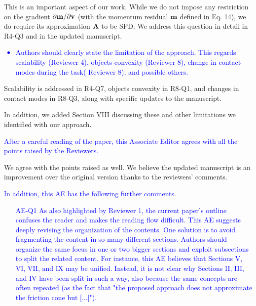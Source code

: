 This is an important aspect of our work. While we do not impose any restriction
on the gradient $\partial {\mathbf{m}}/\partial {\mathbf{v}}$ (with the momentum residual
${\mathbf{m}}$ defined in Eq. 14), we do require its approximation ${\mathbf{A}}$ to be SPD.
We address this question in detail in R4-Q3 and in the updated manuscript.


\textcolor{blue}{
\begin{itemize}
    \item Authors should clearly state the limitation of the approach. This
regards scalability (Reviewer 4), objects convexity (Reviewer 8), change in
contact modes during the task( Reviewer 8), and possible others. \end{itemize}}

Scalability is addressed in R4-Q7, objects convexity in R8-Q1, and changes in
contact modes in R8-Q3, along with specific updates to the manuscript.

In addition, we added Section VIII discussing these and other limitations we
identified with our approach.

\vspace{5mm}
\textcolor{blue}{After a careful reading of the paper, this Associate Editor
agrees with all the points raised by the Reviewers.}

We agree with the points raised as well. We believe the updated manuscript is an
improvement over the original version thanks to the reviewers' comments.

\vspace{5mm}
\textcolor{blue}{In addition, this AE has the following further comments.}
\textcolor{blue}{
\begin{itemize}
    \item[AE-Q1] As also highlighted by Reviewer 1, the current paper's outline
confuses the reader and makes the reading flow difficult. This AE suggests
deeply revising the organization of the contents. One solution is to avoid
fragmenting the content in so many different sections. Authors should organize
the same focus in one or two bigger sections and exploit subsections to split
the related content. For instance, this AE believes that Sections V, VI, VII,
and IX may be unified. Instead, it is not clear why Sections II, III, and IV
have been split in such a way, also because the same concepts are often repeated
(as the fact that "the proposed approach does not approximate the friction cone
but [...]").\end{itemize}}

